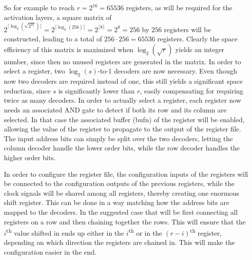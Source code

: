 \begin{itemize}
    So for example to reach $r = 2^{16} = 65536$ registers, as will be required for the activation layers, a square matrix of $2^{\lceil\log_{2}(\sqrt{2^{16}})\rceil} = 2^{\lceil\log_{2}(256)\rceil} = 2^{\lceil8\rceil} = 2^{8} = 256$ by $256$ registers will be constructed, leading to a total of $256 \cdot 256 = 65536$ registers. Clearly the space efficiency of this matrix is maximized when $\log_{2}(\sqrt{r})$ yields an integer number, since then no unused registers are generated in the matrix. In order to select a register, two $\log_{2}(s)$-to-1 decoders are now necessary. Even though now two decoders are required instead of one, this still yields a significant space reduction, since $s$ is significantly lower than $r$, easily compensating for requiring twice as many decoders. In order to actually select a register, each register now needs an associated AND gate to detect if both its row and its column are selected. In that case the associated buffer (bufn) of the register will be enabled, allowing the value of the register to propagate to the output of the register file. The input address bits can simply be split over the two decoders, letting the column decoder handle the lower order bits, while the row decoder handles the higher order bits.
    
    In order to configure the register file, the configuration inputs of the registers will be connected to the configuration outputs of the previous registers, while the clock signals will be shared among all registers, thereby creating one enormous shift register. This can be done in a way matching how the address bits are mapped to the decoders. In the suggested case that will be first connecting all registers on a row and then chaining together the rows. This will ensure that the $i$\textsuperscript{th} value shifted in ends up either in the $i$\textsuperscript{th} or in the $(r - i)$\textsuperscript{th} register, depending on which direction the registers are chained in. This will make the configuration easier in the end.
    

\end{itemize}
